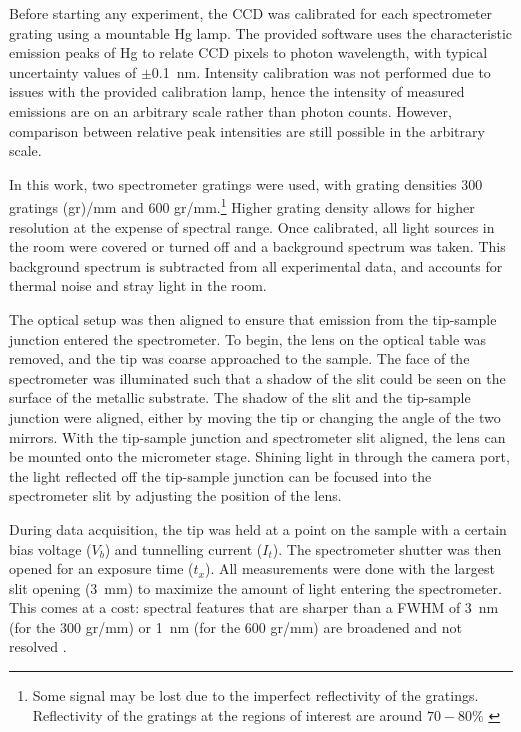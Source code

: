 Before starting any experiment, the \ac{CCD} was calibrated for each spectrometer grating using a mountable Hg lamp. The provided software uses the characteristic emission peaks of Hg to relate \ac{CCD} pixels to photon wavelength, with typical uncertainty values of $\pm$\SI{0.1}{nm}. Intensity calibration was not performed due to issues with the provided calibration lamp, hence the intensity of measured emissions are on an arbitrary scale rather than photon counts. However, comparison between relative peak intensities are still possible in the arbitrary scale.

In this work, two spectrometer gratings were used, with grating densities 300 gratings (gr)/mm and 600 gr/mm.\footnote{Some signal may be lost due to the imperfect reflectivity of the gratings. Reflectivity of the gratings at the regions of interest are around $70 - 80 \%$ \citep{princetongratings}} Higher grating density allows for higher resolution at the expense of spectral range. Once calibrated, all light sources in the room were covered or turned off and a background spectrum was taken. This background spectrum is subtracted from all experimental data, and accounts for thermal noise and stray light in the room.

The optical setup was then aligned to ensure that emission from the tip-sample junction entered the spectrometer. To begin, the lens on the optical table was removed, and the tip was coarse approached to the sample. The face of the spectrometer was illuminated such that a shadow of the slit could be seen on the surface of the metallic substrate. The shadow of the slit and the tip-sample junction were aligned, either by moving the tip or changing the angle of the two mirrors. With the tip-sample junction and spectrometer slit aligned, the lens can be mounted onto the micrometer stage. Shining light in through the camera port, the light reflected off the tip-sample junction can be focused into the spectrometer slit by adjusting the position of the lens.

During data acquisition, the tip was held at a point on the sample with a certain bias voltage ($V_b$) and tunnelling current ($I_t$). The spectrometer shutter was then opened for an exposure time ($t_x$). All measurements were done with the largest slit opening (\SI{3}{mm}) to maximize the amount of light entering the spectrometer. This comes at a cost: spectral features that are sharper than a \ac{FWHM} of \SI{3}{nm} (for the 300 gr/mm) or \SI{1}{nm} (for the 600 gr/mm) are broadened and not resolved \citep{princetonslit}. 



